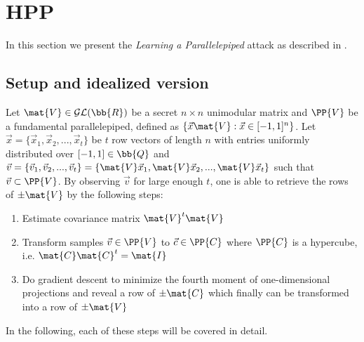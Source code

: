 \newtheorem{lemma}{Lemma}
\newtheorem{proof}{Proof}

\section{HPP}
In this section we present the \textit{Learning a Parallelepiped} attack as described in \cite{NR09}.
\subsection{Setup and idealized version}
Let $\mat{V} \in \mathcal{GL}(\bb{R})$ be a secret $n \times n$ unimodular matrix and $\PP{V}$ be a fundamental parallelepiped, defined as $\{\vec{x}\mat{V}: \vec{x} \in [-1, 1]^n\}$. Let $\vec{x} = \{\vec{x}_1, \vec{x}_2, ...,\vec{x}_t\}$
be $t$ row vectors of length $n$ with entries uniformly distributed over $[-1, 1] \in \bb{Q}$ and $\vec{v} = \{\vec{v}_1, \vec{v}_2, ..., \vec{v}_t\} = \{\mat{V} \vec{x}_1, \mat{V} \vec{x}_2, ..., \mat{V} \vec{x}_t\}$ 
such that $\vec{v} \subset \PP{V}$. By observing $\vec{v}$ for large enough $t$, one is able to retrieve the rows of $\pm \mat{V}$ by the following steps:
\begin{enumerate}
    \item Estimate covariance matrix $\mat{V}^t \mat{V}$
    \item Transform samples $\vec{v} \in \PP{V}$ to $\vec{c} \in \PP{C}$ where $\PP{C}$ is a hypercube, i.e. $\mat{C} \mat{C}^t = \mat{I}$
    \item Do gradient descent to minimize the fourth moment of one-dimensional projections and reveal a row of $\pm \mat{C}$ which finally can be transformed into a row of $\pm \mat{V}$
\end{enumerate}
In the following, each of these steps will be covered in detail.
